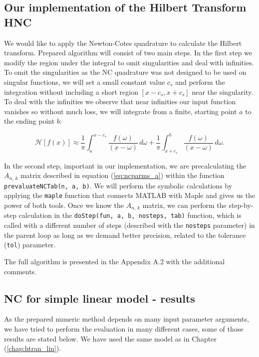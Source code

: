 \documentclass[12pt,twoside,a4paper]{article}
\numberwithin{equation}{subsection}
\numberwithin{figure}{subsection}
\begin{document}
\subsection{Our implementation of the Hilbert Transform HNC}  \label{chap:nc_hilbert_transform}

We would like to apply the Newton-Cotes quadrature to calculate the Hilbert transform. Prepared algorithm will consist of two
main steps. In the first step we modify the region under the integral to omit singularities and deal with infinities. To omit the
singularities as the NC quadrature was not designed to be used on singular functions, we will set a small constant value $c_s$ and
perform the integration without including a short region $[x - c_s, x + c_s]$ near the singularity. To deal with the infinities we observe
that near infinities our input function vanishes so without much loss, we will integrate from a finite, starting point $a$ to the ending
point $b$:

\begin{equation}
	\mathcal{H}[f(x)] \approx \frac{1}{\pi} \int_{ a }^{ x - c_s } \frac{ f(\omega) }{ (x - \omega) } \, d\omega 
                           +  \frac{1}{\pi} \int_{ x + c_s }^{ b } \frac{ f(\omega) }{ (x - \omega) } \, d\omega .
\end{equation} 

In the second step, important in our implementation, we are pre\-calculating the $A_{n, \, k}$ matrix described in equation
(\ref{eq:ncparms_a}) within the function \texttt{prevaluateNCTab(n, a, b)}. We will perform the symbolic calculations by applying
the \texttt{maple} function that connects MATLAB with Maple and gives us the power of both tools. Once we know the $A_{n, \, k}$ matrix, we
can perform the step-by-step calculation in the \texttt{doStep(fun, a, b, nosteps, tab)} function, which is called with a different number
of steps (described with the \texttt{nosteps} parameter) in the parent loop as long as we demand better precision, related to the tolerance
(\texttt{tol}) parameter.

The full algorithm is presented in the Appendix A.2 with the additional comments. 

\subsection{NC for simple linear model - results} \label{chap:nc_lin}

As the prepared numeric method depends on many input parameter arguments, we have tried to perform the evaluation in many different
cases, some of those results are stated below. We have used the same model as in Chapter (\ref{chap:htran_lin}).
\end{document}
